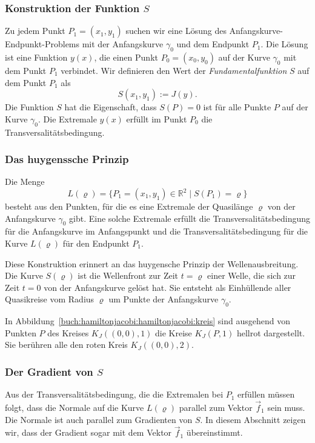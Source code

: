 %
%
\subsubsection{Konstruktion der Funktion $S$}
Zu jedem Punkt $P_1=(x_1,y_1)$ suchen wir eine Lösung des
Anfangskurve-Endpunkt-Problems mit der Anfangskurve $\gamma_0$
und dem Endpunkt $P_1$.
Die Lösung ist eine Funktion $y(x)$, die einen Punkt $P_0=(x_0,y_0)$ auf der
Kurve $\gamma_0$ mit dem Punkt $P_1$ verbindet.
Wir definieren den Wert der {\em Fundamentalfunktion} $S$ auf dem
%
Punkt $P_1$ als
\begin{equation}
S(x_1,y_1)
:=
J(y).
\label{buch:hamiltonjacobi:jacobi:eqn:Sdef}
\end{equation}
Die Funktion $S$ hat die Eigenschaft, dass $S(P)=0$ ist für alle
Punkte $P$ auf der Kurve $\gamma_0$.
Die Extremale $y(x)$ erfüllt im Punkt $P_0$ die Transversalitätsbedingung.

%
%
\subsubsection{Das huygenssche Prinzip}
%
%
Die Menge 
\[
L(\varrho)
=
\{
P_1=(x_1,y_1)\in\mathbb{R}^2
\mid
S(P_1)=\varrho
\}
\]
besteht aus den Punkten, für die es eine Extremale der Quasilänge
$\varrho$ von der Anfangskurve $\gamma_0$ gibt.
Eine solche Extremale erfüllt die Transversalitätsbedingung für die
Anfangskurve im Anfangspunkt und die Transversalitätsbedingung
für die Kurve $L(\varrho)$ für den Endpunkt $P_1$.

Diese Konstruktion erinnert an das huygensche Prinzip der Wellenausbreitung.
Die Kurve $S(\varrho)$ ist die Wellenfront zur Zeit $t=\varrho$ einer Welle,
die sich zur Zeit $t=0$ von der Anfangskurve gelöst hat.
Sie entsteht als Einhüllende aller Quasikreise vom Radius $\varrho$ 
um Punkte der Anfangskurve $\gamma_0$.

\begin{beispiel}
In Abbildung~\ref{buch:hamiltonjacobi:hamiltonjacobi:kreis} sind
ausgehend von Punkten $P$ des Kreises $K_J((0,0),1)$ die Kreise
$K_J(P,1)$ hellrot dargestellt.
Sie berühren alle den roten Kreis $K_J((0,0),2)$.
\end{beispiel}

%
%
\subsubsection{Der Gradient von $S$}
Aus der Transversalitätsbedingung, die die Extremalen bei $P_1$ erfüllen
müssen folgt, dass die Normale auf die Kurve $L(\varrho)$ parallel
zum Vektor $\vec{f}_1$ sein muss.
Die Normale ist auch parallel zum Gradienten von $S$.
In diesem Abschnitt zeigen wir, dass der Gradient sogar mit dem 
Vektor $\vec{f}_1$ übereinstimmt.


